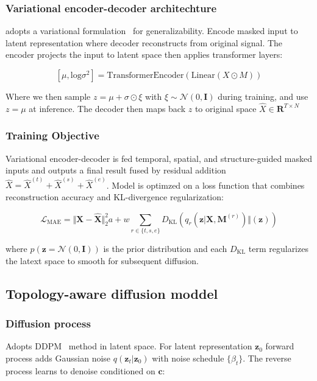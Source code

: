 \documentclass[11pt]{article}
\begin{document}
\subsubsection{Variational encoder-decoder architechture} adopts a variational formulation~\cite{jordan1998variational} for generalizability. Encode masked input to latent representation where decoder reconstructs from original signal. The encoder projects the input to latent space then applies transformer layers:

\[
  [\mu, \text{log}\sigma^2] = \text{TransformerEncoder}(\text{Linear}(X\odot M))
\]

Where we then sample $z = \mu + \sigma \odot \xi$ with $\xi \sim \mathcal{N}(0, \textbf{I})$ during training, and use $z=\mu$ at inference. The decoder then maps back $z$ to original space $\hat{X}\in\mathbf{R}^{T\times N}$

\subsubsection{Training Objective}

Variational encoder-decoder is fed temporal, spatial, and structure-guided masked inputs and outputs a final result fused by residual addition $\hat{X} = \hat{X}^{(t)} + \hat{X}^{(s)} + \hat{X}^{(e)}$. Model is optimzed on a loss function that combines reconstruction accuracy and KL-divergence regularization:

\[
  \mathcal{L}_{\text{MAE}}=\Vert\textbf{X} - \hat{\textbf{X}}\Vert_2^2a+w\sum_{r\in \{t, s, e \}} D_\text{KL}(q_r(\textbf{z}|\textbf{X},\textbf{M}^{(r)})\Vert(\textbf{z}))
\]

where $p(\textbf{z}=\mathcal{N}(0, \textbf{I}))$ is the prior distribution and each $D_\text{KL}$ term regularizes the latext space to smooth for subsequent diffusion.

\subsection{Topology-aware diffusion moddel}

\subsubsection{Diffusion process}
Adopts DDPM~\cite{ho2020denoising} method in latent space. For latent representation $\textbf{z}_0$ forward process adds Gaussian noise $q(\textbf{z}_t\vert\textbf{z}_0)$ with noise schedule $\{\beta_t\}$. The reverse process learns to denoise conditioned on $\textbf{c}$:
\end{document}
